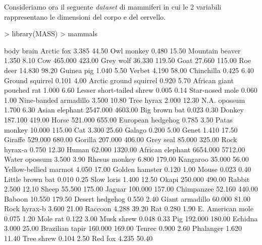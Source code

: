 \documentclass[onecolumn,12pt]{book}
\begin{document}
Consideriamo ora il seguente \emph{dataset} di mammiferi  in cui le 2 variabili rappresentano  le dimensioni del corpo e del cervello.
\begin{Schunk}
\begin{Sinput}
> library(MASS)
> mammals
\end{Sinput}
\begin{Soutput}
                              body   brain
Arctic fox                   3.385   44.50
Owl monkey                   0.480   15.50
Mountain beaver              1.350    8.10
Cow                        465.000  423.00
Grey wolf                   36.330  119.50
Goat                        27.660  115.00
Roe deer                    14.830   98.20
Guinea pig                   1.040    5.50
Verbet                       4.190   58.00
Chinchilla                   0.425    6.40
Ground squirrel              0.101    4.00
Arctic ground squirrel       0.920    5.70
African giant pouched rat    1.000    6.60
Lesser short-tailed shrew    0.005    0.14
Star-nosed mole              0.060    1.00
Nine-banded armadillo        3.500   10.80
Tree hyrax                   2.000   12.30
N.A. opossum                 1.700    6.30
Asian elephant            2547.000 4603.00
Big brown bat                0.023    0.30
Donkey                     187.100  419.00
Horse                      521.000  655.00
European hedgehog            0.785    3.50
Patas monkey                10.000  115.00
Cat                          3.300   25.60
Galago                       0.200    5.00
Genet                        1.410   17.50
Giraffe                    529.000  680.00
Gorilla                    207.000  406.00
Grey seal                   85.000  325.00
Rock hyrax-a                 0.750   12.30
Human                       62.000 1320.00
African elephant          6654.000 5712.00
Water opossum                3.500    3.90
Rhesus monkey                6.800  179.00
Kangaroo                    35.000   56.00
Yellow-bellied marmot        4.050   17.00
Golden hamster               0.120    1.00
Mouse                        0.023    0.40
Little brown bat             0.010    0.25
Slow loris                   1.400   12.50
Okapi                      250.000  490.00
Rabbit                       2.500   12.10
Sheep                       55.500  175.00
Jaguar                     100.000  157.00
Chimpanzee                  52.160  440.00
Baboon                      10.550  179.50
Desert hedgehog              0.550    2.40
Giant armadillo             60.000   81.00
Rock hyrax-b                 3.600   21.00
Raccoon                      4.288   39.20
Rat                          0.280    1.90
E. American mole             0.075    1.20
Mole rat                     0.122    3.00
Musk shrew                   0.048    0.33
Pig                        192.000  180.00
Echidna                      3.000   25.00
Brazilian tapir            160.000  169.00
Tenrec                       0.900    2.60
Phalanger                    1.620   11.40
Tree shrew                   0.104    2.50
Red fox                      4.235   50.40
\end{Soutput}
\end{Schunk}
\end{document}
